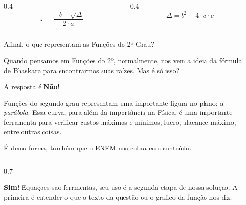 \documentclass[aspectratio=169, t, 8pt]{beamer}
\begin{document}
    \begin{frame}[plain]
        \vspace*{\fill}
        \begin{columns}
            \begin{column}{0.4\textwidth}
                \Huge{
                    \[
                x = \frac{-b \pm \sqrt{\Delta}}{2 \cdot a}
            \]
        }
            \end{column}
            \begin{column}{0.4\textwidth}
                \Huge{
            \[
                \Delta = b^2 - 4 \cdot a \cdot c
            \]
        }
            \end{column}
        \end{columns}
        \vspace*{\fill}
    \end{frame}

    \begin{frame}{Afinal, o que representam as Funções do 2º Grau?}
    
        \vspace{0.2cm}

        Quando pensamos em Funções do 2º, normalmente, nos vem a ideia da fórmula de Bhaskara para encontrarmos suas raízes. Mas é só isso?

        A resposta é \textbf{Não}!

        Funções do segundo grau representam uma importante figura no plano: a \textit{parábola}. Essa curva, para além da importância na Física, é uma importante ferramenta para verificar custos máximos e mínimos, lucro, alacance máximo, entre outras coisas.

        É dessa forma, também que o ENEM nos cobra esse conteúdo.

        \vspace{1em}

        \begin{columns}[T]
            \begin{column}{0.7\textwidth}
                \begin{cardverde}[title=Bhaskara --- O plano B?]
                    \textbf{Sim!} Equações são ferrmentas, seu uso é a segunda etapa de nossa solução. A primeira é entender o que o texto da questão ou o gráfico da função nos diz.
                \end{cardverde}        
            \end{column}
        \end{columns}
\end{frame}
\end{document}
